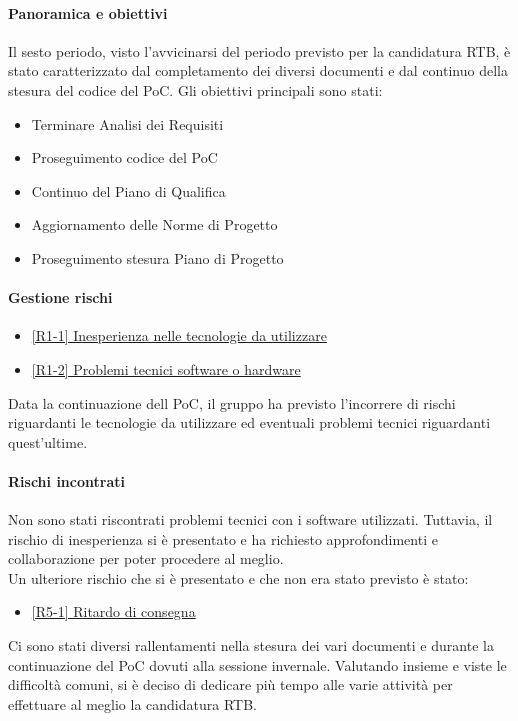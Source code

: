 \documentclass[a4paper,12pt]{article}
\begin{document}
            \paragraph{Panoramica e obiettivi}
            Il sesto periodo, visto l'avvicinarsi del periodo previsto per la candidatura RTB, è stato caratterizzato dal completamento dei diversi documenti e dal continuo della stesura del codice del PoC. Gli obiettivi principali sono stati:
            \begin{itemize}
                \item Terminare Analisi dei Requisiti
                \item Proseguimento codice del PoC
                \item Continuo del Piano di Qualifica
                \item Aggiornamento delle Norme di Progetto
                \item Proseguimento stesura Piano di Progetto
            \end{itemize}
            
            \paragraph{Gestione rischi}
                \begin{itemize}
                \item\hyperref[tab:r1]{[R1-1] Inesperienza nelle tecnologie da utilizzare}
                \item\hyperref[tab:r1]{[R1-2] Problemi tecnici software o hardware}
                \end{itemize}
                Data la continuazione dell PoC, il gruppo ha previsto l'incorrere di rischi riguardanti le tecnologie da utilizzare ed eventuali problemi tecnici riguardanti quest'ultime.
    
                \paragraph*{Rischi incontrati}
                Non sono stati riscontrati problemi tecnici con i software utilizzati. Tuttavia, il rischio di inesperienza si è presentato e ha richiesto approfondimenti e collaborazione per poter procedere al meglio.
                \\Un ulteriore rischio che si è presentato e che non era stato previsto è stato:
                \begin{itemize}
                    \item \hyperref[tab:r5]{[R5-1] Ritardo di consegna}
                \end{itemize}
                Ci sono stati diversi rallentamenti nella stesura dei vari documenti e durante la continuazione del PoC dovuti alla sessione invernale. Valutando insieme e viste le difficoltà comuni, si è deciso di dedicare più tempo alle varie attività per effettuare al meglio la candidatura RTB.
                
\end{document}

